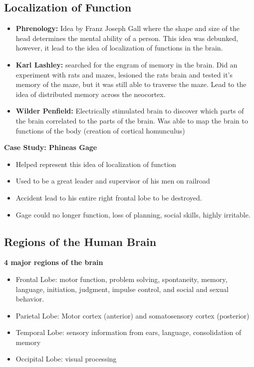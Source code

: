 \documentclass{article}
\begin{document}
\subsection{Localization of Function}
\begin{itemize}
    \item \textbf{Phrenology:} Idea by Franz Joseph Gall where the shape and size of the head determines the mental ability of a person. This idea was debunked, however, it lead to the idea of localization of functions in the brain. 
    \item \textbf{Karl Lashley:} searched for the engram of memory in the brain. Did an experiment with rats and mazes, lesioned the rats brain and tested it's memory of the maze, but it was still able to traverse the maze. Lead to the idea of distributed memory across the neocortex.
    \item \textbf{Wilder Penfield:} Electrically stimulated brain to discover which parts of the brain correlated to the parts of the brain. Was able to map the brain to functions of the body (creation of cortical homunculus) 
\end{itemize}

\noindent\textbf{Case Study: Phineas Gage}
\begin{itemize}
    \item Helped represent this idea of localization of function
    \item Used to be a great leader and supervisor of his men on railroad
    \item Accident lead to his entire right frontal lobe to be destroyed. 
    \item Gage could no longer function, loss of planning, social skills, highly irritable. 
\end{itemize}

\subsection{Regions of the Human Brain}
\textbf{4 major regions of the brain}
\begin{itemize}
    \item Frontal Lobe: motor function, problem solving, spontaneity, memory, language, initiation, judgment, impulse control, and social and sexual behavior.
    \item Parietal Lobe: Motor cortex (anterior) and somatosensory cortex (posterior) 
    \item Temporal Lobe: sensory information from ears, language, consolidation of memory
    \item Occipital Lobe: visual processing
\end{itemize}
\end{document}
